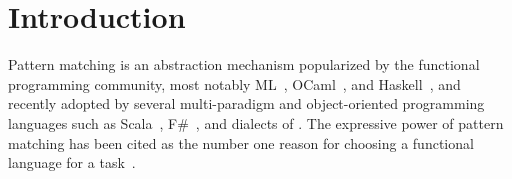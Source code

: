 \section{Introduction} %
\label{sec:intro}


Pattern matching is an abstraction mechanism popularized by the functional
programming community, most notably ML~\cite{ML78},
OCaml~\cite{OPM01}, and Haskell~\cite{haskell90},
and recently adopted by several multi-paradigm and object-oriented programming 
languages such as Scala~\cite{Scala2nd}, F\#~\cite{Syme07}, 
 and dialects of 
\Cpp{}\cite{Prop96,App}.
The expressive power of pattern matching has been cited as the number one reason 
for choosing a functional language for a task~\cite{FramaC09,Minsky08,Nanavati08}. 

